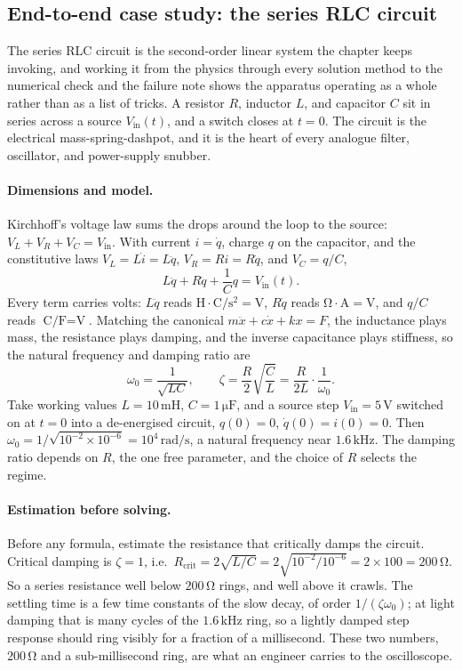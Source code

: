 \subsection{End-to-end case study: the series RLC circuit}

The series RLC circuit is the second-order linear system the chapter
keeps invoking, and working it from the physics through every
solution method to the numerical check and the failure note shows
the apparatus operating as a whole rather than as a list of tricks.
A resistor $R$, inductor $L$, and capacitor $C$ sit in series across
a source $V_{\text{in}}(t)$, and a switch closes at $t = 0$. The
circuit is the electrical mass-spring-dashpot, and it is the heart
of every analogue filter, oscillator, and power-supply snubber.

\paragraph{Dimensions and model.} Kirchhoff's voltage law sums the
drops around the loop to the source: $V_{L} + V_{R} + V_{C} =
V_{\text{in}}$. With current $i = \dot{q}$, charge $q$ on the
capacitor, and the constitutive laws $V_{L} = L\dot{i} = L\ddot{q}$,
$V_{R} = Ri = R\dot{q}$, and $V_{C} = q/C$,
\[
L\ddot{q} + R\dot{q} + \frac{1}{C}q = V_{\text{in}}(t).
\]
Every term carries volts: $L\ddot{q}$ reads
$\si{\henry}\cdot\si{\coulomb\per\second\squared} = \si{\volt}$,
$R\dot{q}$ reads $\si{\ohm}\cdot\si{\ampere} = \si{\volt}$, and
$q/C$ reads $\si{\coulomb\per\farad} = \si{\volt}$. Matching the
canonical $m\ddot{x} + c\dot{x} + kx = F$, the inductance plays
mass, the resistance plays damping, and the inverse capacitance
plays stiffness, so the natural frequency and damping ratio are
\[
\omega_{0} = \frac{1}{\sqrt{LC}}, \qquad \zeta = \frac{R}{2}
\sqrt{\frac{C}{L}} = \frac{R}{2L}\cdot\frac{1}{\omega_{0}}.
\]
Take working values $L = 10\,\si{\milli\henry}$, $C =
1\,\si{\micro\farad}$, and a source step $V_{\text{in}} =
5\,\si{\volt}$ switched on at $t = 0$ into a de-energised circuit,
$q(0) = 0$, $\dot{q}(0) = i(0) = 0$. Then $\omega_{0} =
1/\sqrt{10^{-2}\times 10^{-6}} = 10^{4}\,\si{\radian\per\second}$,
a natural frequency near $1.6\,\si{\kilo\hertz}$. The damping ratio
depends on $R$, the one free parameter, and the choice of $R$
selects the regime.

\paragraph{Estimation before solving.} Before any formula, estimate
the resistance that critically damps the circuit. Critical damping
is $\zeta = 1$, i.e.\ $R_{\text{crit}} = 2\sqrt{L/C} = 2\sqrt{10^{-2}
/10^{-6}} = 2\times 100 = 200\,\si{\ohm}$. So a series resistance
well below $200\,\si{\ohm}$ rings, and well above it crawls. The
settling time is a few time constants of the slow decay, of order
$1/(\zeta\omega_{0})$; at light damping that is many cycles of the
$1.6\,\si{\kilo\hertz}$ ring, so a lightly damped step response
should ring visibly for a fraction of a millisecond. These two
numbers, $200\,\si{\ohm}$ and a sub-millisecond ring, are what an
engineer carries to the oscilloscope.

